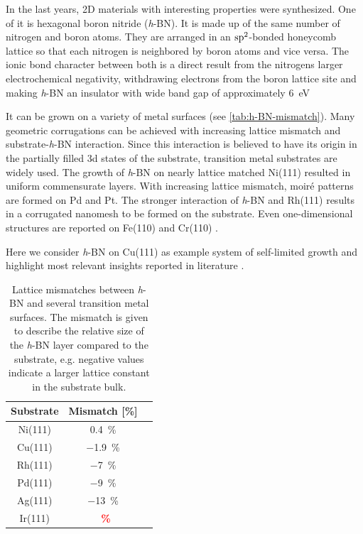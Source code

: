 In the last years, 2D materials with interesting properties were synthesized. One of it is hexagonal boron nitride (\textit{h}-BN). It is made up of the same number of nitrogen and boron atoms. They are arranged in an $\textnormal{sp}^2$-bonded honeycomb lattice so that each nitrogen is neighbored by boron atoms and vice versa. The ionic bond character between both is a direct result from the nitrogens larger electrochemical negativity, withdrawing electrons from the boron lattice site and making \textit{h}-BN an insulator with wide band gap of approximately \SI{6}{\eV} \cite{watanabe_direct-bandgap_2004, cassabois_hexagonal_2016, blase_quasiparticle_1995}

It can be grown on a variety of metal surfaces (see \autoref{tab:h-BN-mismatch}). Many geometric corrugations can be achieved with increasing lattice mismatch and substrate-\textit{h}-BN interaction. Since this interaction is believed to have its origin in the partially filled 3d states of the substrate, transition metal substrates are widely used. 
The growth of \textit{h}-BN on nearly lattice matched Ni(111) resulted in uniform commensurate layers. With increasing lattice mismatch, moir\'e patterns are formed on Pd and Pt. The stronger interaction of \textit{h}-BN and Rh(111) results in a corrugated nanomesh to be formed on the substrate. Even one-dimensional structures are reported on Fe(110) \cite{vinogradov_one-dimensional_2012} and Cr(110) \cite{muller_one-dimensional_2008}. 

Here we consider \textit{h}-BN on Cu(111) as example system of self-limited growth and highlight most relevant insights reported in literature \cite{joshi_boron_2012, schwarz_corrugation_2017, auwarter_hexagonal_2018}.

\begin{table}\centering
	\caption{Lattice mismatches between \textit{h}-BN and several transition metal surfaces. The mismatch is given to describe the relative size of the \textit{h}-BN layer compared to the substrate, e.g. negative values indicate a larger lattice constant in the substrate bulk.}
	
	\begin{tabular}{ccc}
		Substrate 	& Mismatch [\%] \\ \hline
		Ni(111)		& \SI{+0.4}{\percent} \\
		Cu(111)		& \SI{-1.9}{\percent} \\	
		Rh(111)		& \SI{-7}{\percent} \\	
		Pd(111)		& \SI{-9}{\percent} \\
		Ag(111)		& \SI{-13}{\percent} \\
		Ir(111)		& \textcolor{red}{\textbf{\SI{}{\percent}}} \\
	\end{tabular}
	\label{tab:h-BN-mismatch}
\end{table}

